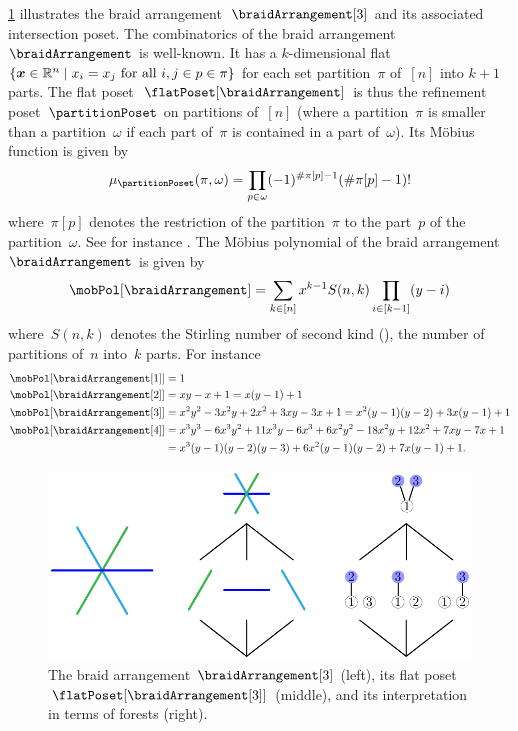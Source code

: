 \cref{fig:braidArrangement3} illustrates the braid arrangement~$\braidArrangement[3]$ and its associated intersection poset. 
The combinatorics of the braid arrangement~$\braidArrangement$ is well-known.
It has a $k$-dimensional flat~$\left\{ \boldsymbol{x} \in \mathbb R^n \;\middle|\; x_i = x_j \text{ for all } i, j \in p \in \pi \right\}$ for each set partition~$\pi$ of~$[n]$ into $k+1$ parts.
The flat poset~$\flatPoset[\braidArrangement]$ is thus the refinement poset~$\partitionPoset$ on partitions of~$[n]$ (where a partition~$\pi$ is smaller than a partition~$\omega$ if each part of~$\pi$ is contained in a part of~$\omega$).
Its M\"obius function is given by
\[
\mu_{\partitionPoset}(\pi, \omega) = \prod_{p \in \omega} (-1)^{\#\pi[p]-1}(\#\pi[p]-1)!
\]
where~$\pi[p]$ denotes the restriction of the partition~$\pi$ to the part~$p$ of the partition~$\omega$.
See for instance \cite{Birkhoff, Rota}.
The M\"obius polynomial of the braid arrangement~$\braidArrangement$ is given by
\[
\mobPol[\braidArrangement] = \sum_{k \in [n]} x^{k-1} S(n,k) \prod_{i \in [k-1]} (y-i)
\]
where~$S(n,k)$ denotes the Stirling number of second kind (), \ie the number of partitions of~$n$ into~$k$ parts.
For instance
\begin{align*}
\mobPol[{\braidArrangement[1]}] & = 1 \\
\mobPol[{\braidArrangement[2]}] & = x y - x + 1 = x (y - 1) + 1 \\
\mobPol[{\braidArrangement[3]}] & = x^2 y^2 - 3 x^2 y + 2 x^2 + 3 x y - 3 x + 1 = x^2 (y - 1) (y - 2) + 3 x (y - 1) + 1\\
\mobPol[{\braidArrangement[4]}] & = x^3 y^3 - 6 x^3 y^2 + 11 x^3 y - 6 x^3 + 6 x^2 y^2 - 18 x^2 y + 12 x^2 + 7 x y - 7 x + 1 \\
& = x^3 (y - 1) (y - 2) (y - 3) + 6 x^2 (y - 1) (y - 2) + 7 x (y - 1) + 1.
\end{align*}

\begin{figure}
	\centerline{\includegraphics[scale=.9]{figures/intersectionPosetBraidArrangement3Full}}
	\caption{The braid arrangement $\braidArrangement[3]$ (left), its flat poset~$\flatPoset[{\braidArrangement[3]}]$ (middle), and its interpretation in terms of forests (right).}
	\label{fig:braidArrangement3}
\end{figure}

